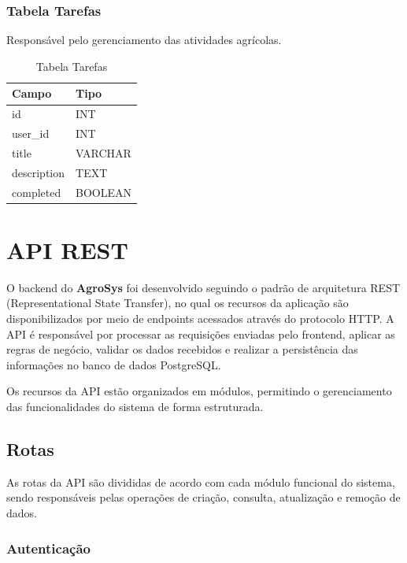 \documentclass[12pt]{article}
\begin{document}
\subsubsection{Tabela Tarefas}

Responsável pelo gerenciamento das atividades agrícolas.

\begin{table}[H]
  \centering
  \caption{Tabela Tarefas}
  \begin{tabular}{|l|l|}
    \hline
    \textbf{Campo} & \textbf{Tipo} \\ \hline
    id             & INT           \\ \hline
    user\_id       & INT           \\ \hline
    title          & VARCHAR       \\ \hline
    description    & TEXT          \\ \hline
    completed      & BOOLEAN       \\ \hline
  \end{tabular}
\end{table}

\section{API REST}

O backend do \textbf{AgroSys} foi desenvolvido seguindo o padrão de arquitetura REST (Representational State Transfer), no qual os recursos da aplicação são disponibilizados por meio de endpoints acessados através do protocolo HTTP. A API é responsável por processar as requisições enviadas pelo frontend, aplicar as regras de negócio, validar os dados recebidos e realizar a persistência das informações no banco de dados PostgreSQL.

Os recursos da API estão organizados em módulos, permitindo o gerenciamento das funcionalidades do sistema de forma estruturada.

\subsection{Rotas}

As rotas da API são divididas de acordo com cada módulo funcional do sistema, sendo responsáveis pelas operações de criação, consulta, atualização e remoção de dados.


\subsubsection{Autenticação}
\end{document}
